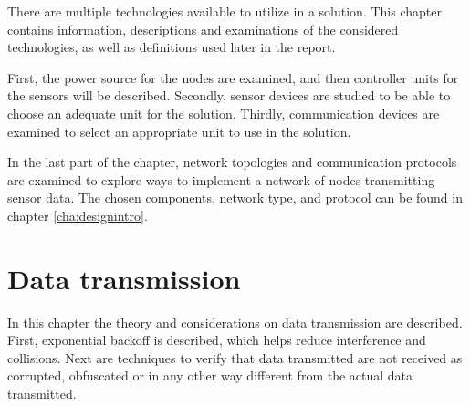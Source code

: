 \label{cha:technologies}
There are multiple technologies available to utilize in a solution. This chapter contains information, descriptions and examinations of the considered technologies, as well as definitions used later in the report.

First, the power source for the nodes are examined, and then controller units for the sensors will be described. Secondly, sensor devices are studied to be able to choose an adequate unit for the solution. Thirdly, communication devices are examined to select an appropriate unit to use in the solution. 

In the last part of the chapter, network topologies and communication protocols are examined to explore ways to implement a network of nodes transmitting sensor data. The chosen components, network type, and protocol can be found in chapter \ref{cha:designintro}.













\chapter{Data transmission}
In this chapter the theory and considerations on data transmission are described. First, exponential backoff is described, which helps reduce interference and collisions. Next are techniques to verify that data transmitted are not received as corrupted, obfuscated or in any other way different from the actual data transmitted.




